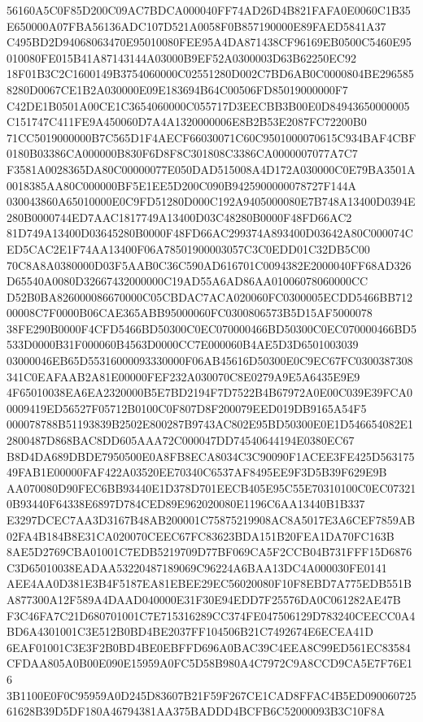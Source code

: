 \documentclass[UTF8,fontset=fandol,zihao=-4,a4paper]{ctexart}
\begin{document}
{{56160A5C0F85D200C09AC7BDCA000040FF74AD26D4B821FAFA0E0060C1B35E650000A07FBA56136ADC107D521A0058F0B857190000E89FAED5841A37
C495BD2D94068063470E95010080FEE95A4DA871438CF96169EB0500C5460E95010080FE015B41A87143144A03000B9EF52A0300003D63B62250EC92
18F01B3C2C1600149B3754060000C02551280D002C7BD6AB0C0000804BE2965858280D0067CE1B2A030000E09E183694B64C00506FD85019000000F7
C42DE1B0501A00CE1C3654060000C055717D3EECBB3B00E0D84943650000005C151747C411FE9A450060D7A4A1320000006E8B2B53E2087FC72200B0
71CC5019000000B7C565D1F4AECF66030071C60C9501000070615C934BAF4CBF0180B03386CA000000B830F6D8F8C301808C3386CA0000007077A7C7
F3581A0028365DA80C00000077E050DAD515008A4D172A030000C0E79BA3501A0018385AA80C000000BF5E1EE5D200C090B9425900000078727F144A
030043860A65010000E0C9FD51280D000C192A9405000080E7B748A13400D0394E280B0000744ED7AAC1817749A13400D03C48280B0000F48FD66AC2
81D749A13400D03645280B0000F48FD66AC299374A893400D03642A80C000074CED5CAC2E1F74AA13400F06A78501900003057C3C0EDD01C32DB5C00
70C8A8A0380000D03F5AAB0C36C590AD616701C0094382E2000040FF68AD326D65540A0080D32667432000000C19AD55A6AD86AA01006078060000CC
D52B0BA826000086670000C05CBDAC7ACA020060FC0300005ECDD5466BB71200008C7F0000B06CAE365ABB95000060FC0300806573B5D15AF5000078
38FE290B0000F4CFD5466BD50300C0EC070000466BD50300C0EC070000466BD5533D0000B31F000060B4563D0000CC7E000060B4AE5D3D6501003039
03000046EB65D55316000093330000F06AB45616D50300E0C9EC67FC0300387308341C0EAFAAB2A81E00000FEF232A030070C8E0279A9E5A6435E9E9
4F65010038EA6EA2320000B5E7BD2194F7D7522B4B67972A0E00C039E39FCA00009419ED56527F05712B0100C0F807D8F200079EED019DB9165A54F5
000078788B51193839B2502E800287B9743AC802E95BD50300E0E1D546654082E12800487D868BAC8DD605AAA72C000047DD74540644194E0380EC67
B8D4DA689DBDE7950500E0A8FB8ECA8034C3C90090F1ACEE3FE425D56317549FAB1E00000FAF422A03520EE70340C6537AF8495EE9F3D5B39F629E9B
AA070080D90FEC6BB93440E1D378D701EECB405E95C55E70310100C0EC073210B93440F64338E6897D784CED89E962020080E1196C6AA13440B1B337
E3297DCEC7AA3D3167B48AB200001C75875219908AC8A5017E3A6CEF7859AB02FA4B184B8E31CA020070CEEC67FC83623BDA151B20FEA1DA70FC163B
8AE5D2769CBA01001C7EDB5219709D77BF069CA5F2CCB04B731FFF15D6876C3D65010038EADAA53220487189069C96224A6BAA13DC4A000030FE0141
AEE4AA0D381E3B4F5187EA81EBEE29EC56020080F10F8EBD7A775EDB551BA877300A12F589A4DAAD040000E31F30E94EDD7F25576DA0C061282AE47B
F3C46FA7C21D680701001C7E715316289CC374FE047506129D783240CEECC0A4BD6A4301001C3E512B0BD4BE2037FF104506B21C7492674E6ECEA41D
6EAF01001C3E3F2B0BD4BE0EBFFD696A0BAC39C4EEA8C99ED561EC83584CFDAA805A0B00E090E15959A0FC5D58B980A4C7972C9A8CCD9CA5E7F76E16
3B1100E0F0C95959A0D245D83607B21F59F267CE1CAD8FFAC4B5ED09006072561628B39D5DF180A46794381AA375BADDD4BCFB6C52000093B3C10F8A
}}
\end{document}
